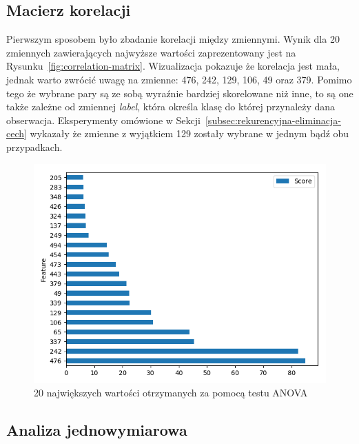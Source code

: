 \documentclass[a4paper,12pt]{article}
\begin{document}
    \subsection{Macierz korelacji}\label{subsec:macierz-korelacji}

    Pierwszym sposobem było zbadanie korelacji między zmiennymi.
    Wynik dla 20 zmiennych zawierających najwyższe wartości zaprezentowany jest na Rysunku~\ref{fig:correlation-matrix}.
    Wizualizacja pokazuje że korelacja jest mała, jednak warto zwrócić uwagę na zmienne: 476, 242, 129, 106, 49 oraz 379.
    Pomimo tego że wybrane pary są ze sobą wyraźnie bardziej skorelowane niż inne, to są one także zależne od zmiennej \textit{label}, która określa klasę do której przynależy dana obserwacja.
    Eksperymenty omówione w Sekcji~\ref{subsec:rekurencyjna-eliminacja-cech} wykazały że zmienne z wyjątkiem 129 zostały wybrane w jednym bądź obu przypadkach.

    \begin{figure}
        \vspace{-40pt}
        \centering
        \includegraphics[width=\linewidth]{../images/univariate-selection.png}
        \caption{20 największych wartości otrzymanych za pomocą testu ANOVA}
        \label{fig:univariate-selection}
    \end{figure}

    \subsection{Analiza jednowymiarowa}\label{subsec:wybor-jednowymiarowy}
\end{document}

